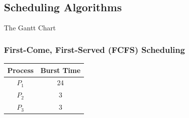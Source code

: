 \subsection{Scheduling Algorithms}
The Gantt Chart

\subsubsection{First-Come, First-Served (FCFS) Scheduling}

\begin{table}[!htb]
    \centering
    \begin{tabular}[c]{cc}\toprule
        Process & Burst Time \\ \midrule
        $P_1$ & 24 \\
        $P_2$ & 3 \\
        $P_3$ & 3 
        \\ \bottomrule
    \end{tabular}
\end{table}

